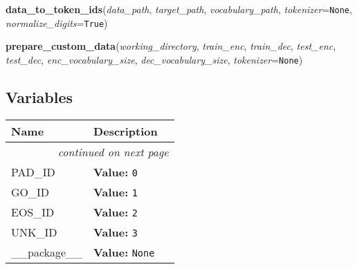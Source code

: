 \hspace{.8\funcindent}\begin{boxedminipage}{\funcwidth}

    \raggedright \textbf{data\_to\_token\_ids}(\textit{data\_path}, \textit{target\_path}, \textit{vocabulary\_path}, \textit{tokenizer}={\tt None}, \textit{normalize\_digits}={\tt True})

\setlength{\parskip}{2ex}
\setlength{\parskip}{1ex}
    \end{boxedminipage}

    \label{Chatbot:data_utils:prepare_custom_data}

    \vspace{0.5ex}

\hspace{.8\funcindent}\begin{boxedminipage}{\funcwidth}

    \raggedright \textbf{prepare\_custom\_data}(\textit{working\_directory}, \textit{train\_enc}, \textit{train\_dec}, \textit{test\_enc}, \textit{test\_dec}, \textit{enc\_vocabulary\_size}, \textit{dec\_vocabulary\_size}, \textit{tokenizer}={\tt None})

\setlength{\parskip}{2ex}
\setlength{\parskip}{1ex}
    \end{boxedminipage}



  \subsection{Variables}

    \vspace{-1cm}
\hspace{\varindent}\begin{longtable}{|p{\varnamewidth}|p{\vardescrwidth}|l}
\cline{1-2}
\cline{1-2} \centering \textbf{Name} & \centering \textbf{Description}& \\
\cline{1-2}
\endhead\cline{1-2}\multicolumn{3}{r}{\small\textit{continued on next page}}\\\endfoot\cline{1-2}
\endlastfoot\raggedright P\-A\-D\-\_\-I\-D\- & \raggedright \textbf{Value:} 
{\tt 0}&\\
\cline{1-2}
\raggedright G\-O\-\_\-I\-D\- & \raggedright \textbf{Value:} 
{\tt 1}&\\
\cline{1-2}
\raggedright E\-O\-S\-\_\-I\-D\- & \raggedright \textbf{Value:} 
{\tt 2}&\\
\cline{1-2}
\raggedright U\-N\-K\-\_\-I\-D\- & \raggedright \textbf{Value:} 
{\tt 3}&\\
\cline{1-2}
\raggedright \_\-\_\-p\-a\-c\-k\-a\-g\-e\-\_\-\_\- & \raggedright \textbf{Value:} 
{\tt None}&\\
\cline{1-2}
\end{longtable}

